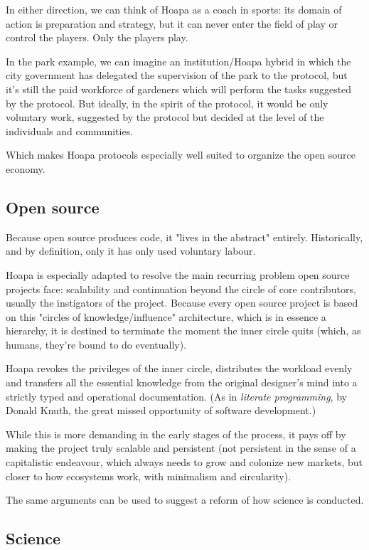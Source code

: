 \documentclass[11pt]{article}
\begin{document}
In either direction, we can think of Hoapa as a coach in sports: its domain of action is preparation and strategy, but it can never enter the field of play or control the players. Only the players play.

In the park example, we can imagine an institution/Hoapa hybrid in which the city government has delegated the supervision of the park to the protocol, but it's still the paid workforce of gardeners which will perform the tasks suggested by the protocol. But ideally, in the spirit of the protocol, it would be only voluntary work, suggested by the protocol but decided at the level of the individuals and communities.

Which makes Hoapa protocols especially well suited to organize the open source economy.

\subsection{Open source}

Because open source produces code, it "lives in the abstract" entirely. Historically, and by definition, only it has only used voluntary labour.

Hoapa is especially adapted to resolve the main recurring problem open source projects face: scalability and continuation beyond the circle of core contributors, usually the instigators of the project. Because every open source project is based on this "circles of knowledge/influence" architecture, which is in essence a hierarchy, it is destined to terminate the moment the inner circle quits (which, as humans, they're bound to do eventually).

Hoapa revokes the privileges of the inner circle, distributes the workload evenly and transfers all the essential knowledge from the original designer's mind into a strictly typed and operational documentation. (As in \emph{literate programming}, by Donald Knuth, the great missed opportunity of software development.)

While this is more demanding in the early stages of the process, it pays off by making the project truly scalable and persistent (not persistent in the sense of a capitalistic endeavour, which always needs to grow and colonize new markets, but closer to how ecosystems work, with minimalism and circularity).

The same arguments can be used to suggest a reform of how science is conducted.

\subsection{Science}
\end{document}
